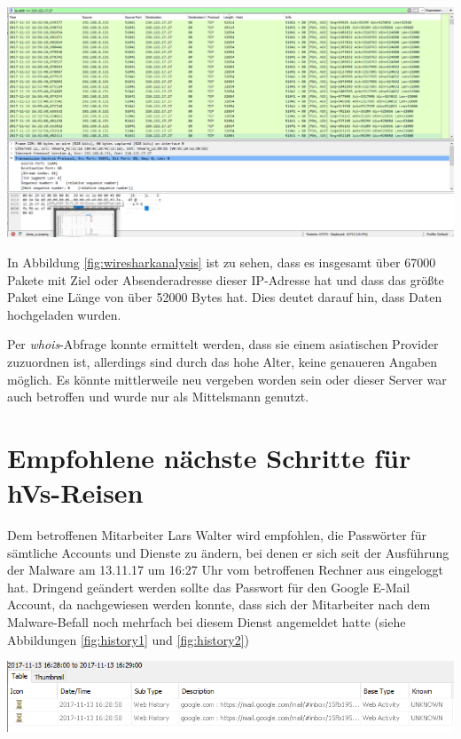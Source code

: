 \begin{center}
	\includegraphics[width=15.8cm]{figures/wiresharkanalysis.png}
	\label{fig:wiresharkanalysis}
\end{center}

In Abbildung \ref{fig:wiresharkanalysis} ist zu sehen, dass es insgesamt über 67000 Pakete mit Ziel oder Absenderadresse dieser IP-Adresse hat und dass das größte Paket eine Länge von über 52000 Bytes hat. Dies deutet darauf hin, dass Daten hochgeladen wurden.

Per \textit{whois}-Abfrage konnte ermittelt werden, dass sie einem asiatischen Provider zuzuordnen ist, allerdings sind durch das hohe Alter, keine genaueren Angaben möglich. Es könnte mittlerweile neu vergeben worden sein oder dieser Server war auch betroffen und wurde nur als Mittelsmann genutzt.

\chapter{Empfohlene nächste Schritte für hVs-Reisen}

Dem betroffenen Mitarbeiter Lars Walter wird empfohlen, die Passwörter für sämtliche Accounts und Dienste zu ändern, bei denen er sich seit der Ausführung der Malware am 13.11.17 um 16:27 Uhr vom betroffenen Rechner aus eingeloggt hat.
Dringend geändert werden sollte das Passwort für den Google E-Mail Account, da nachgewiesen werden konnte, dass sich der Mitarbeiter nach dem Malware-Befall noch mehrfach bei diesem Dienst angemeldet hatte (siehe Abbildungen \ref{fig:history1} und \ref{fig:history2})

\begin{center}
	\includegraphics[width=15.8cm]{figures/history1.PNG}
	\label{fig:history1}
\end{center}

